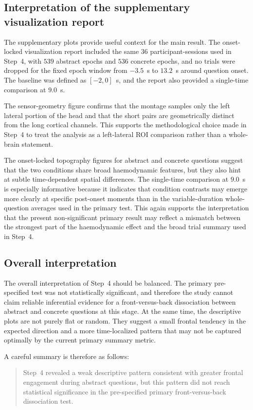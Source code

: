 \subsection{Interpretation of the supplementary visualization report}
The supplementary plots provide useful context for the main result.
The onset-locked visualization report included the same $36$ participant-sessions used in Step~4,
with $539$ abstract epochs and $536$ concrete epochs, and no trials were dropped for the fixed epoch
window from $-3.5$~s to $13.2$~s around question onset.
The baseline was defined as $[-2,0]$~s, and the report also provided a single-time comparison at
$9.0$~s.

The sensor-geometry figure confirms that the montage samples only the left lateral portion of the
head and that the short pairs are geometrically distinct from the long cortical channels.
This supports the methodological choice made in Step~4 to treat the analysis as a left-lateral ROI
comparison rather than a whole-brain statement.

The onset-locked topography figures for abstract and concrete questions suggest that the two
conditions share broad haemodynamic features, but they also hint at subtle time-dependent spatial
differences.
The single-time comparison at $9.0$~s is especially informative because it indicates that condition
contrasts may emerge more clearly at specific post-onset moments than in the variable-duration
whole-question averages used in the primary test.
This again supports the interpretation that the present non-significant primary result may reflect a
mismatch between the strongest part of the haemodynamic effect and the broad trial summary used in
Step~4.

\subsection{Overall interpretation}
The overall interpretation of Step~4 should be balanced.
The primary pre-specified test was not statistically significant, and therefore the study cannot claim
reliable inferential evidence for a front-versus-back dissociation between abstract and concrete
questions at this stage.
At the same time, the descriptive plots are not purely flat or random.
They suggest a small frontal tendency in the expected direction and a more time-localized pattern
that may not be captured optimally by the current primary summary metric.

A careful summary is therefore as follows:
\begin{quote}
Step~4 revealed a weak descriptive pattern consistent with greater frontal engagement during abstract
questions, but this pattern did not reach statistical significance in the pre-specified primary
front-versus-back dissociation test.
\end{quote}

